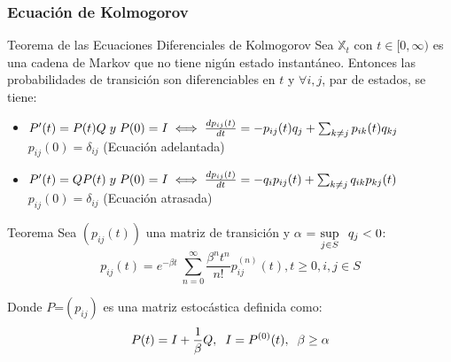 \documentclass{beamer}
\begin{document}
\begin{frame}
    \frametitle{Ecuación de Kolmogorov}
    \begin{block}{Teorema de las Ecuaciones Diferenciales de Kolmogorov}
    Sea $\mathbb{X}_{t}$ con $t \in [0,\infty)$ es una cadena de Markov que no tiene nigún estado instantáneo. Entonces las probabilidades de transición son diferenciables en $t$ y $\forall i,j$, par de estados, se tiene:
\begin{itemize}
			\item $P'(t) = P(t)Q\hspace{0.1cm}y\hspace{0.1cm}P(0) = I \iff \frac{dp_{ij}(t)}{dt} = -p_{ij}(t)q_{j} + \sum_{k \neq j} p_{ik}(t)q_{kj} \hspace{0.5cm}$
			\newline
			$ p_{ij}(0) = \delta_{ij}$  (Ecuación adelantada)
			\item $P'(t) = QP(t)\hspace{0.1cm}y\hspace{0.1cm}P(0) = I\iff \frac{dp_{ij}(t)}{dt} = -q_{i}p_{ij}(t) + \sum_{k \neq j} q_{ik}p_{kj}(t)$
			\newline
			$p_{ij}(0) = \delta_{ij}$   (Ecuación atrasada)
\end{itemize}
    \end{block}
\end{frame}
\begin{frame}
\begin{block}{Teorema}
Sea $(p_{ij}(t))$	una matriz de transición y $\alpha$ = $\sup\limits_{j\in S} \hspace{0.2cm} q_j <0$:
   		\begin{equation*}
   		p_{ij}(t)=e^{-\beta t}\ \sum_{n = 0}^{\infty}\frac{\beta^{n} t^{n}}{n!}p_{ij}^{(n)}(t), t \geq 0, i,j \in S
   		\end{equation*}
   		
   		Donde $P$=$(p_{ij})$ es una matriz estocástica definida como:
   		\begin{equation*}
   		P(t)=I+\frac{1}{\beta}Q, \hspace{0.2cm} I= P^{(0)}(t), \hspace{0.2cm} \beta \geq \alpha
   		\end{equation*}
\end{block}
\end{frame}
\end{document}
